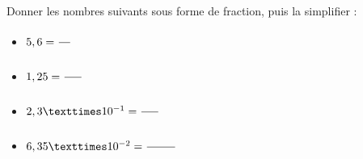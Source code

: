 \documentclass{automatisme}
\begin{document}
\begin{frame}
	Donner les nombres suivants sous forme de fraction, puis la simplifier :
	\begin{itemize}
		\item $5,6 = \dfrac{\correction{56}}{\correction{10}} \correction{= \dfrac{28}{5}}$
		\item $1,25 = \dfrac{\correction{125}}{\correction{100}} \correction{= \dfrac{5}{4}}$
		\item $2,3 × 10^{-1} = \dfrac{\correction{23}}{\correction{100}}$
		\item $6,35 × 10^{-2} = \dfrac{\correction{635}}{\correction{10000}} \correction{= \dfrac{127}{2000}}$
	\end{itemize}
\end{frame}
\end{document}
